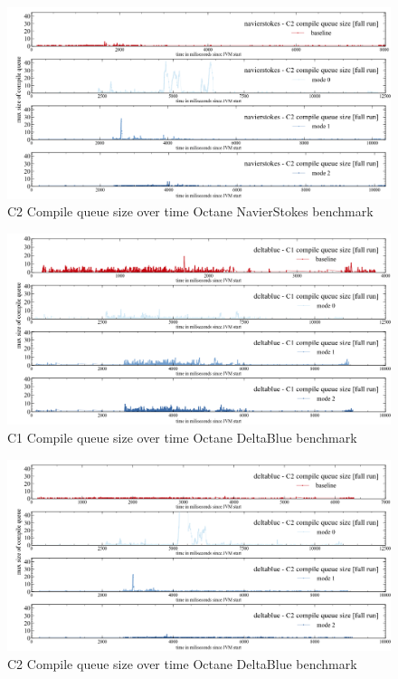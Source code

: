 \begin{figure}[ht]
  \begin{center}
    \centering
    \includegraphics[width=1.0\textwidth]{figures/octane_queue_navierstokes_separate_c2.png}
    \caption{C2 Compile queue size over time Octane NavierStokes benchmark}
    \label{f:octane_queue_navierstokes_separate_c2}
  \end{center}
\end{figure}
\begin{figure}[ht]
  \begin{center}
    \centering
    \includegraphics[width=1.0\textwidth]{figures/octane_queue_deltablue_separate_c1.png}
    \caption{C1 Compile queue size over time Octane DeltaBlue benchmark}
    \label{f:octane_queue_deltablue_separate_c1}
  \end{center}
\end{figure}
\begin{figure}[ht]
  \begin{center}
    \centering
    \includegraphics[width=1.0\textwidth]{figures/octane_queue_deltablue_separate_c2.png}
    \caption{C2 Compile queue size over time Octane DeltaBlue benchmark}
    \label{f:octane_queue_deltablue_separate_c2}
  \end{center}
\end{figure}
